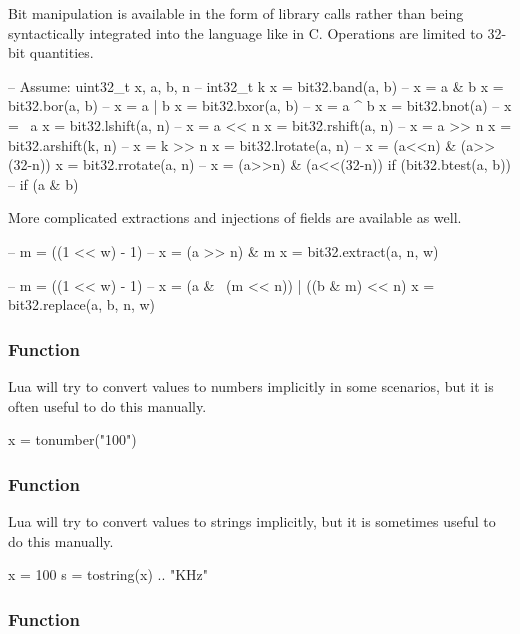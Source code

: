 Bit manipulation is available in the form of library calls rather than being
syntactically  integrated into the language like in C.  Operations are limited
to 32-bit quantities.

\begin{LuaCode}
-- Assume: uint32_t x, a, b, n
--         int32_t k
x = bit32.band(a, b)    -- x = a & b
x = bit32.bor(a, b)     -- x = a | b
x = bit32.bxor(a, b)    -- x = a ^ b
x = bit32.bnot(a)       -- x = ~a
x = bit32.lshift(a, n)  -- x = a << n
x = bit32.rshift(a, n)  -- x = a >> n
x = bit32.arshift(k, n) -- x = k >> n
x = bit32.lrotate(a, n) -- x = (a<<n) & (a>>(32-n))
x = bit32.rrotate(a, n) -- x = (a>>n) & (a<<(32-n))
if (bit32.btest(a, b))  -- if (a & b)
\end{LuaCode}

More complicated extractions and injections of fields are available as well.

\begin{LuaCode}
-- m = ((1 << w) - 1)
-- x = (a >> n) & m
x = bit32.extract(a, n, w)
\end{LuaCode}

\begin{LuaCode}
-- m = ((1 << w) - 1)
-- x = (a & ~(m << n)) | ((b & m) << n)
x = bit32.replace(a, b, n, w)
\end{LuaCode}

\subsubsection{ Function}

Lua will try to convert values to numbers implicitly in some scenarios, but it
is often useful to do this manually.

\begin{LuaCode}
x = tonumber("100")
\end{LuaCode}

\subsubsection{ Function}

Lua will try to convert values to strings implicitly, but it is sometimes
useful to do this manually.

\begin{LuaCode}
x = 100
s = tostring(x) .. "KHz"
\end{LuaCode}

\subsubsection{ Function}


